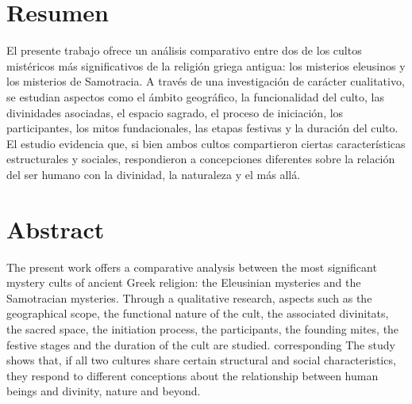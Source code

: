 \cleardoublepage
\section*{Resumen}

El presente trabajo ofrece un análisis comparativo entre dos de los cultos mistéricos más significativos de la religión griega antigua: los misterios eleusinos y los misterios de Samotracia. A través de una investigación de carácter cualitativo, se estudian aspectos como el ámbito geográfico, la funcionalidad del culto, las divinidades asociadas, el espacio sagrado, el proceso de iniciación, los participantes, los mitos fundacionales, las etapas festivas y la duración del culto. El estudio evidencia que, si bien ambos cultos compartieron ciertas características estructurales y sociales, respondieron a concepciones diferentes sobre la relación del ser humano con la divinidad, la naturaleza y el más allá.


\section*{Abstract}

The present work offers a comparative analysis between the most significant mystery cults of ancient Greek religion: the Eleusinian mysteries and the Samotracian mysteries. Through a qualitative research, aspects such as the geographical scope, the functional nature of the cult, the associated divinitats, the sacred space, the initiation process, the participants, the founding mites, the festive stages and the duration of the cult are studied. corresponding The study shows that, if all two cultures share certain structural and social characteristics, they respond to different conceptions about the relationship between human beings and divinity, nature and beyond.
